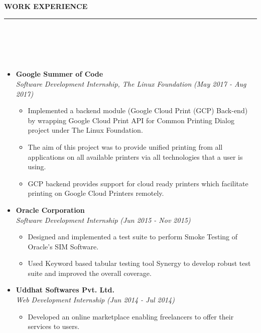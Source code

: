 \documentclass[a4paper,10pt]{article}
\newcommand{\isep}{-2 pt}
\newcommand{\lsep}{-0.5cm}
\newcommand{\resheading}[1]{{\small
        {
            \begin{minipage}
                {0.975\textwidth}\textbf{{\textsc{#1 \vphantom{p\^{E}} }}}
                \\[-0.3cm]
                \hrule
            \end{minipage}
            \\[-0.5cm]
        }
 }}
\begin{document}
\resheading{\textbf{\large WORK EXPERIENCE}}\\[\lsep] \\[-0.4cm]
\begin{itemize}
\item \textbf{Google Summer of Code}  \\
    \emph{Software Development Internship, The Linux Foundation} \hfill {\emph{(May 2017 - Aug 2017)}}
    \\[-0.6cm]
    \begin{itemize}
        \item Implemented a backend module (Google Cloud Print (GCP) Back-end) by wrapping Google Cloud Print API for Common Printing Dialog project under The Linux Foundation.
        \item The aim of this project was to provide unified printing from all applications on all available printers via all technologies that a user is using.
        \item GCP backend provides support for cloud ready printers which facilitate printing on Google Cloud Printers remotely.
    \end{itemize}

\item \textbf{Oracle Corporation} \\
    \emph{Software Development Internship}
    \hfill {\emph{(Jun 2015 - Nov 2015)}}
    \\ [-0.6cm]
      \begin{itemize}\itemsep \isep
        \item Designed and implemented a test suite to perform Smoke Testing of Oracle's SIM Software.
        \item Used Keyword based tabular testing tool Synergy to develop robust test suite and improved the overall coverage.
    \\ [-0.6cm]
      \end{itemize}

\item \textbf{Uddhat Softwares Pvt. Ltd.} \\
    \emph{Web Development Internship} \hfill {\emph{(Jun 2014 - Jul 2014)}}
    \\ [-0.6cm]
    \begin{itemize}\itemsep \isep
    \item Developed an online marketplace enabling freelancers to offer their services to users.
    \end{itemize}
\end{itemize}
\end{document}
